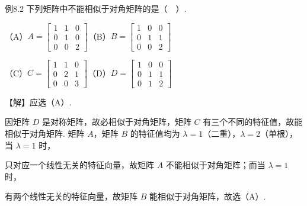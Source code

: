 \begin{fcard}{例8.2}
下列矩阵中不能相似于对角矩阵的是（$\quad$）.

（A）$A=\begin{bmatrix}1&1&0\\0&1&0\\0&0&2\end{bmatrix}$\qquad（B）$B=\begin{bmatrix}1&0&0\\0&1&1\\0&0&2\end{bmatrix}$

（C）$C=\begin{bmatrix}1&1&0\\0&2&1\\0&0&3\end{bmatrix}$\qquad（D）$D=\begin{bmatrix}1&0&0\\0&1&1\\0&1&2\end{bmatrix}$

【解】应选（A）.

因矩阵 $D$ 是对称矩阵，故必相似于对角矩阵，矩阵 $C$ 有三个不同的特征值，故能相似于对角矩阵. 矩阵 $A$，矩阵 $B$ 的特征值均为 $\lambda=1$（二重），$\lambda=2$（单根），当 $\lambda=1$ 时，


只对应一个线性无关的特征向量，故矩阵 $A$ 不能相似于对角矩阵；而当 $\lambda=1$ 时，


有两个线性无关的特征向量，故矩阵 $B$ 能相似于对角矩阵，故选（A）.
\end{fcard}

